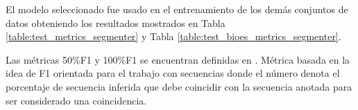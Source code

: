\documentclass[a4paper,11pt,twocolumn,twoside]{article}
\begin{document}




El modelo seleccionado fue usado en el entrenamiento de los demás conjuntos de datos obteniendo los resultados mostrados
en Tabla \ref{table:test_metrics_segmenter} y Tabla \ref{table:test_bioes_metrics_segmenter}.

Las métricas 50\%F1 y 100\%F1 se encuentran definidas en \cite{persing2016end}.
Métrica basada en la idea de F1 orientada para el trabajo con secuencias donde el número denota el porcentaje de secuencia inferida que debe coincidir con 
la secuencia anotada para ser considerado una coincidencia.
\end{document}
